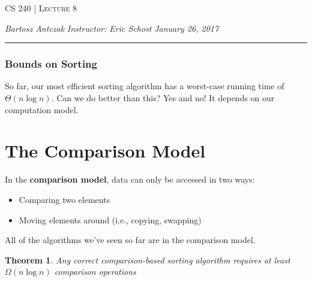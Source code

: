 \documentclass{report}
\newcommand{\lectureNum}{8}
\newcommand{\curDate}{January 26, 2017}
\newcommand{\course}{CS 240}
\newtheorem{Theorem}{Theorem}
\begin{document}
\begin{center}
\begin{Large}
\textsc{\course{} | Lecture \lectureNum{}}
\end{Large}
\end{center} 
\noindent \textit{Bartosz Antczak} \hfill
\textit{Instructor: Eric Schost} \hfill
\textit{\curDate{}}
\rule{\textwidth}{0.4pt}

\subsubsection{Bounds on Sorting}

So far, our most efficient sorting algorithm has a worst-case running
time of $\Theta(n \log n)$. Can we do better than this? Yes and no! It
depends on our computation model.


\section{The Comparison Model}
In the \textbf{comparison model}, data can only be accessed in two ways:
\begin{itemize}
\item Comparing two elements
\item Moving elements around (i.e., copying, swapping)
\end{itemize}
All of the algorithms we've seen so far are in the comparison model.

\begin{Theorem}
{Any correct comparison-based sorting algorithm requires at least $\Omega(n \log n)$ comparison operations}
\end{Theorem}
\end{document}
